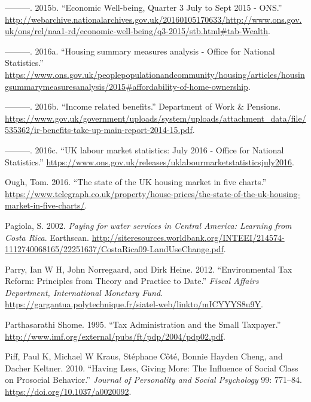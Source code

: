 \documentclass[]{tufte-handout}
\begin{document}
\leavevmode\hypertarget{ref-ONSWELLBEING2015}{}%
---------. 2015b. ``Economic Well-being, Quarter 3 July to Sept 2015 -
ONS.''
\url{http://webarchive.nationalarchives.gov.uk/20160105170633/http://www.ons.gov.uk/ons/rel/naa1-rd/economic-well-being/q3-2015/stb.html\#tab-Wealth}.

\leavevmode\hypertarget{ref-ONS2016a}{}%
---------. 2016a. ``Housing summary measures analysis - Office for
National Statistics.''
\url{https://www.ons.gov.uk/peoplepopulationandcommunity/housing/articles/housingsummarymeasuresanalysis/2015\#affordability-of-home-ownership}.

\leavevmode\hypertarget{ref-ONS2016c}{}%
---------. 2016b. ``Income related benefits.'' Department of Work \&
Pensions.
\url{https://www.gov.uk/government/uploads/system/uploads/attachment_data/file/535362/ir-benefits-take-up-main-report-2014-15.pdf}.

\leavevmode\hypertarget{ref-ONS2016b}{}%
---------. 2016c. ``UK labour market statistics: July 2016 - Office for
National Statistics.''
\url{https://www.ons.gov.uk/releases/uklabourmarketstatisticsjuly2016}.

\leavevmode\hypertarget{ref-Ough2016}{}%
Ough, Tom. 2016. ``The state of the UK housing market in five charts.''
\url{https://www.telegraph.co.uk/property/house-prices/the-state-of-the-uk-housing-market-in-five-charts/}.

\leavevmode\hypertarget{ref-Pagiola2002}{}%
Pagiola, S. 2002. \emph{Paying for water services in Central America:
Learning from Costa Rica}. Earthscan.
\url{http://siteresources.worldbank.org/INTEEI/214574-1112740068165/22251637/CostaRica09-LandUseChange.pdf}.

\leavevmode\hypertarget{ref-Parry2012}{}%
Parry, Ian W H, John Norregaard, and Dirk Heine. 2012. ``Environmental
Tax Reform: Principles from Theory and Practice to Date.'' \emph{Fiscal
Affairs Department, International Monetary Fund}.
\url{https://gargantua.polytechnique.fr/siatel-web/linkto/mICYYYS8u9Y}.

\leavevmode\hypertarget{ref-ParthasarathiShome}{}%
Parthasarathi Shome. 1995. ``Tax Administration and the Small
Taxpayer.''
\url{http://www.imf.org/external/pubs/ft/pdp/2004/pdp02.pdf}.

\leavevmode\hypertarget{ref-Piff2010}{}%
Piff, Paul K, Michael W Kraus, Stéphane Côté, Bonnie Hayden Cheng, and
Dacher Keltner. 2010. ``Having Less, Giving More: The Influence of
Social Class on Prosocial Behavior.'' \emph{Journal of Personality and
Social Psychology} 99: 771--84. \url{https://doi.org/10.1037/a0020092}.
\end{document}
